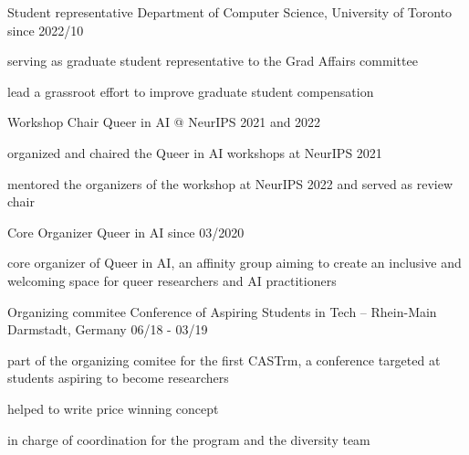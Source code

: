 \begin{cventries}
  \cventry
	{Student representative}
	{Department of Computer Science, University of Toronto}
	{}
	{since 2022/10}
	{
	    \begin{cvitems}
		\item {serving as graduate student representative to the Grad Affairs committee}
		\item {lead a grassroot effort to improve graduate student compensation}
	    \end{cvitems}
	}

  \cventry
    {Workshop Chair} %
    {Queer in AI @ NeurIPS} %
    {}
    {2021 and 2022} %
    {
      \begin{cvitems} %
      	\item {organized and chaired the Queer in AI workshops at NeurIPS 2021}
      	\item {mentored the organizers of the workshop at NeurIPS 2022 and served as review chair}
      \end{cvitems}
    }

  \cventry
    {Core Organizer}
    {Queer in AI} %
    {} %
    {since 03/2020} %
    {
      \begin{cvitems} %
        \item {core organizer of Queer in AI, an affinity group aiming to create an inclusive and welcoming space for queer researchers and AI practitioners}
      \end{cvitems}
    }

  \cventry
    {Organizing commitee} %
    {Conference of Aspiring Students in Tech -- Rhein-Main} %
    {Darmstadt, Germany} %
    {06/18 - 03/19} %
    {
      \begin{cvitems} %
        \item {part of the organizing comitee for the first CASTrm, a conference targeted at students aspiring to become researchers}
        \item {helped to write price winning concept}
        \item {in charge of coordination for the program and the diversity team}
      \end{cvitems}
    }


\end{cventries}
